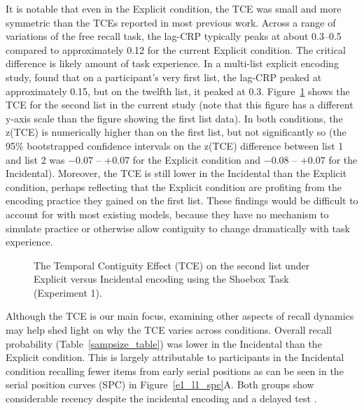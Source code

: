 \documentclass[man,natbib,floatsintext]{apa6} %
\begin{document}
\color{red}
\label{TODO-5}
It is notable that even in the Explicit condition, the TCE was small and more symmetric than the TCEs reported in most previous work. Across a range of variations of the free recall task, the lag-CRP typically peaks at about 0.3--0.5 \citep{HealKaha17} compared to approximately 0.12 for the current Explicit condition. The critical difference is likely amount of task experience. In a multi-list explicit encoding study, \citet{HealKaha17} found that on a participant's very first list, the lag-CRP peaked at approximately 0.15, but on the twelfth list, it peaked at 0.3. Figure~\ref{e1_l2_crp} shows the TCE for the second list in the current study (note that this figure has a different y-axis scale than the figure showing the first list data). In both conditions, the z(TCE) is numerically higher than on the first list, but not significantly so (the 95\% bootstrapped confidence intervals on the z(TCE) difference between list 1 and list 2 was $-0.07$ -- $+0.07$ for the Explicit condition and $-0.08$ -- $+0.07$ for the Incidental)\label{t1}. Moreover, the TCE is still lower in the Incidental than the Explicit condition, perhaps reflecting that the Explicit condition are profiting from the encoding practice they gained on the first list. These findings would be difficult to account for with most existing models, because they have no mechanism to simulate practice or otherwise allow contiguity to change dramatically with task experience.

\begin{figure}
\caption{The Temporal Contiguity Effect (TCE) on the second list under Explicit versus Incidental encoding using the Shoebox Task (Experiment 1).\paneltext}
\label{e1_l2_crp}
\end{figure}

\color{black}


\color{red}
\label{TODO-6}
Although the TCE is our main focus, \label{SPCtalk} examining other aspects of recall dynamics may help shed light on why the TCE varies across conditions. Overall recall probability (Table~\ref{sampsize_table}) was lower in the Incidental than the Explicit condition. This is largely attributable to participants in the Incidental condition recalling fewer items from early serial positions as can be seen in the serial position curves (SPC) in Figure~\ref{e1_l1_spc}A. Both groups show considerable recency despite the incidental encoding and a delayed test \citep[for a similar findings, see][]{MarsWerd72,Neat93,GlenEtal80}.
\end{document}
